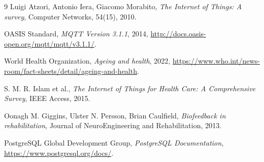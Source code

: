 \documentclass[a4paper,12pt]{article}
\begin{document}
\begin{thebibliography}{9}
Luigi Atzori, Antonio Iera, Giacomo Morabito,
\textit{The Internet of Things: A survey},
Computer Networks, 54(15), 2010.

OASIS Standard,
\textit{MQTT Version 3.1.1},
2014, \url{http://docs.oasis-open.org/mqtt/mqtt/v3.1.1/}.

World Health Organization,
\textit{Ageing and health},
2022, \url{https://www.who.int/news-room/fact-sheets/detail/ageing-and-health}.

S. M. R. Islam et al.,
\textit{The Internet of Things for Health Care: A Comprehensive Survey},
IEEE Access, 2015.

Oonagh M. Giggins, Ulster N. Persson, Brian Caulfield,
\textit{Biofeedback in rehabilitation},
Journal of NeuroEngineering and Rehabilitation, 2013.

PostgreSQL Global Development Group,
\textit{PostgreSQL Documentation},
\url{https://www.postgresql.org/docs/}.
\end{thebibliography}
\end{document}
